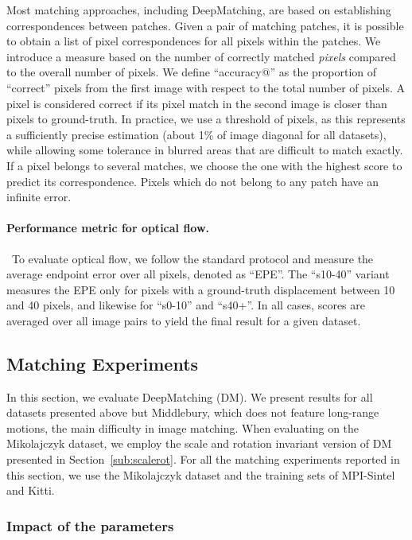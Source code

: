 \documentclass[twocolumn,natbib]{svjour3}
\begin{document}
Most matching approaches, including DeepMatching, 
are based on establishing correspondences between patches.
Given a pair of matching patches, it is possible to obtain a list 
of pixel correspondences for all pixels within the patches. 
We introduce a measure based on the number of 
correctly matched \emph{pixels} compared to the overall number of pixels. 
We  define ``accuracy@'' as the proportion of
``correct'' pixels from the first image with respect to the total
number of pixels. A pixel is considered correct if its pixel match
in the second image is closer than  pixels to ground-truth.
In practice, we use a threshold of  pixels, as
this represents a sufficiently precise estimation (about 1\% of image diagonal for all datasets),
while allowing some tolerance in blurred areas that are difficult to match exactly.
If a pixel belongs to several matches, we choose the one with the
highest score to predict its correspondence.  
Pixels which do not belong to any patch have an infinite error.



\paragraph{Performance metric for optical flow.}\ 
To evaluate optical flow, we follow the standard protocol and 
measure the average endpoint error over all pixels, 
denoted as ``EPE''. The ``s10-40'' variant measures the EPE only for pixels
with a ground-truth displacement between 10 and 40 pixels, and
likewise for ``s0-10'' and ``s40+''. In all cases, scores are averaged
over all image pairs to yield the final result for a given dataset.  


\subsection{Matching Experiments}
\label{sub:matchingxp}

In this section, we evaluate DeepMatching (DM). We present results for
all datasets presented above but Middlebury, which does not feature
long-range motions, the main difficulty in image matching. 
When evaluating on the Mikolajczyk dataset, we employ the scale and
rotation invariant version of DM presented in Section~\ref{sub:scalerot}. 
For all the matching experiments reported in this section, we use the Mikolajczyk dataset and the training sets of MPI-Sintel and Kitti. 

\subsubsection{Impact of the parameters}
\label{sub:paramstuning}
\end{document}
